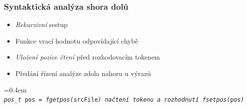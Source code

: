 \begin{frame}
  \frametitle{Syntaktická analýza shora dolů}
        \begin{itemize}
        \setlength\itemsep{1em}
            \item \emph{Rekurzivní} sestup
            \item Funkce vrací hodnotu odpovídající chybě
            \item \emph{Uložení pozice čtení} před rozhodovacím tokenem
            \item Předání řízení analýze zdola nahoru u výrazů
        \end{itemize}

    \vspace{1.5em}

        \begin{flushleft}
        \font=0.4em
        \texttt{
        \\
        \emph{pos\_t} pos = \emph{fgetpos(}srcFile\emph{)}\newline\newline
        \textit{načtení tokenu a rozhodnutí}\newline\newline
        \emph{fsetpos(}pos\emph{)}}
        \end{flushleft}
\end{frame}



